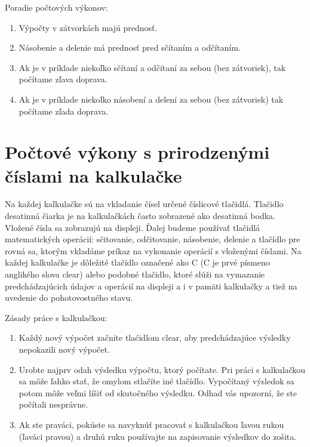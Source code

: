 \documentclass{article}
\begin{document}
Poradie počtových výkonov:
\begin{enumerate}[label=\arabic*)]
  \item Výpočty v zátvorkách majú prednosť.
  \item Násobenie a delenie má prednosť pred sčítaním a odčítaním.
  \item Ak je v príklade niekoľko sčítaní a odčítaní za sebou (bez zátvoriek), tak počítame zľava doprava.
  \item Ak je v príklade niekoľko násobení a delení za sebou (bez zátvoriek) tak počítame zľada doprava.
\end{enumerate}

\section{Počtové výkony s prirodzenými číslami na kalkulačke}

Na každej kalkulačke sú na vkladanie čísel určené číslicové tlačidlá. Tlačidlo desatinná čiarka je na kalkulačkách často zobrazené ako desatinná bodka. Vložené čísla sa zobrazujú na displeji. Ďalej budeme používať tlačidlá matematických operácií: sčitovanie, odčitovanie, násobenie, delenie a tlačídlo pre rovná sa, ktorým vkladáme príkaz na vykonanie operácií s vloženými číslami. Na každej kalkulačke je dôležité tlačídlo označené ako C (C je prvé písmeno anglikého slova clear) alebo podobné tlačidlo, ktoré slúži na vymazanie predchádzajúcich údajov a operácií na displeji a i v pamäti kalkulačky a tiež na uvedenie do pohotovostného stavu.

Zásady práce s kalkulačkou:
\begin{enumerate}[label=\arabic*)]
  \item Každý nový výpočet začnite tlaćidlom clear, aby predchádzajúce výsledky nepokazili nový výpočet.
  \item Urobte najprv odah výsledku výpočtu, ktorý počítate. Pri práci s kalkulačkou sa môže ľahko stať, že omylom stlačíte iné tlačídlo. Vypočítaný výsledok sa potom môže veľmi líšiť od skutočného výsledku. Odhad vás upozorní, že ste počítali nesprávne.
  \item Ak ste praváci, pokúste sa navyknúť pracovať s kalkulačkou ľavou rukou (ľaváci pravou) a druhú ruku používajte na zapisovanie výsledkov do zošita.
\end{enumerate}




\printbibliography
\end{document}
